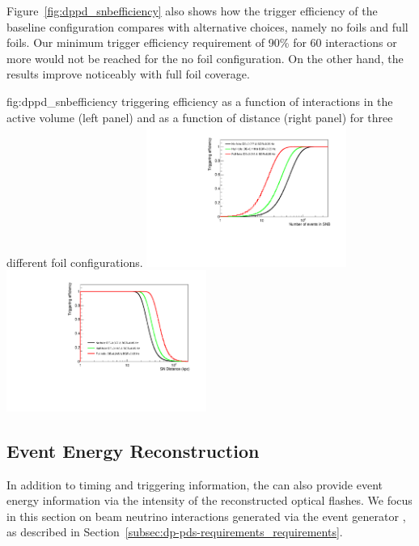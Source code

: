 Figure~\ref{fig:dppd_snbefficiency} also shows how the  trigger efficiency of the baseline configuration compares with alternative choices, namely no foils and full foils. Our minimum  trigger efficiency requirement of \num{90}\% for \num{60}  interactions or more would not be reached for the no foil configuration. On the other hand, the results improve noticeably with full foil coverage. 

\begin{dunefigure}{fig:dppd_snbefficiency}
     { triggering efficiency as a function of  interactions in the active volume (left panel) and as a function of  distance (right panel) for three different  foil configurations.}
     \includegraphics[width=0.49\textwidth]{graphics/dppd_snbefficiency_vs_snevents.pdf} \hfill
    \includegraphics[width=0.49\textwidth]{graphics/dppd_snbefficiency_vs_sndistance.pdf}
    \end{dunefigure}


\subsection{Event Energy Reconstruction}
\label{subsec:dp-pds-performance_calorimetry}

In addition to timing and triggering information, the  can also provide event energy information via the intensity of the reconstructed optical flashes. We focus in this section on beam neutrino interactions generated via the  event generator \cite{Andreopoulos:2009rq}, as described in Section~\ref{subsec:dp-pds-requirements_requirements}.

